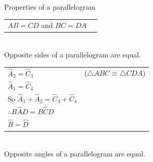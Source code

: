 \begin{wex}{Properties of a parallelogram}
{\begin{tabular}{ll}
$AB = CD$ and $BC = DA$ &  \\ 
\end{tabular} \\ 
Opposite sides of a parallelogram are equal. \\ \newline
\begin{tabular}{ll}
 $\hat{A}_{2} = \hat{C}_{3}$ & ($\triangle ABC \equiv \triangle CDA$) \\
$\hat{A}_{1} = \hat{C}_{4}$ & \\
So $\hat{A}_{1} + \hat{A}_{2} = \hat{C}_{3} + \hat{C}_{4}$ & \\
$\therefore B\hat{A}D = B\hat{C}D$ & \\
$\hat{B} = \hat{D}$ & \\
\end{tabular} \\
Opposite angles of a parallelogram are equal.
}
\end{wex}

